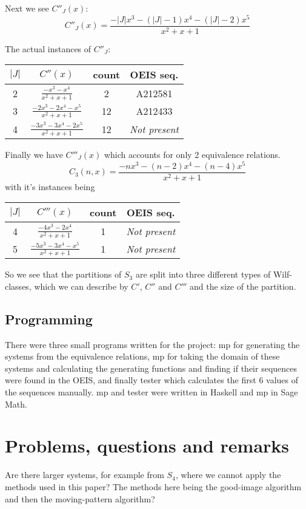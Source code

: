 \documentclass[openany, a4paper, 11pt, english]{article}
\theoremstyle{definition}
\newcommand{\Sym}{S}
\begin{document}
Next we see $C''_J(x)$:
\[
    C''_J(x) = \frac{-|J|x^3-(|J|-1)x^4-(|J|-2)x^5}{x^2+x+1}
\]

The actual instances of $C''_J$:
\begin{center}
\begin{tabular}{c|c|c|c}
    $|J|$ & $C''(x)$ & count & OEIS seq. \\
    \hline
    2 & $\frac{-x^3-x^4}{x^2+x+1}$ & 2 & A212581 \\
    3 & $\frac{-2x^3-2x^4-x^5}{x^2+x+1}$ & 12 & A212433 \\
    4 & $\frac{-3x^3-3x^4-2x^5}{x^2+x+1}$ & 12 & \emph{Not present}\\
\end{tabular}
\end{center}


Finally we have $C'''_J(x)$ which accounts for only 2 equivalence relations.
\[
    C_3(n,x) = \frac{-nx^3-(n-2)x^4-(n-4)x^5}{x^2+x+1}
\]
with it's instances being
\begin{center}
\begin{tabular}{c|c|c|c}
    $|J|$ & $C'''(x)$ & count & OEIS seq. \\
    \hline
    4 & $\frac{-4x^3-2x^4}{x^2+x+1}$ & 1 & \emph{Not present} \\ 
    5 & $\frac{-5x^3-3x^4-x^5}{x^2+x+1}$ & 1 & \emph{Not present}\\
\end{tabular}
\end{center}

So we see that the partitions of $\Sym_3$ are split into three different types
of Wilf-classes, which we can describe by $C'$, $C''$ and $C'''$ and the size
of the partition.

\subsection{Programming}
There were three small programs written for the project: mp for generating the
systems from the equivalence relations, mp for taking the domain of these
systems and calculating the generating functions and finding if their sequences
were found in the OEIS, and finally tester which calculates the first 6 values
of the sequences manually. mp and tester were written in Haskell and mp in Sage Math. 


\section{Problems, questions and remarks}
Are there larger systems, for example from $\Sym_4$, where we cannot apply the
methods used in this paper? The methods here being the good-image algorithm and
then the moving-pattern algorithm?
\end{document}
